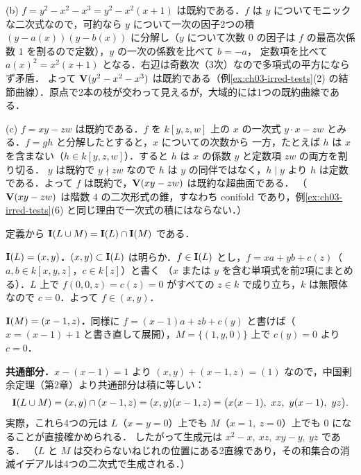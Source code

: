 (b) $f=y^2-x^2-x^3=y^2-x^2(x+1)$ は既約である．$f$ は $y$ についてモニックな二次式なので，可約なら $y$ について一次の因子2つの積
$(y-a(x))(y-b(x))$ に分解し（$y$ について次数 $0$ の因子は $f$ の最高次係数 $1$ を割るので定数），$y$ の一次の係数を比べて $b=-a$，
定数項を比べて $a(x)^2=x^2(x+1)$ となる．右辺は奇数次（3次）なので多項式の平方にならず矛盾．
よって $\mathbf{V}(y^2-x^2-x^3)$ は既約である（例\ref{ex:ch03-irred-tests}(2) の結節曲線）．原点で2本の枝が交わって見えるが，大域的には1つの既約曲線である．

(c) $f=xy-zw$ は既約である．$f$ を $k[y,z,w]$ 上の $x$ の一次式 $y\cdot x-zw$ とみる．$f=gh$ と分解したとすると，$x$ についての次数から
一方，たとえば $h$ は $x$ を含まない（$h\in k[y,z,w]$）．すると $h$ は $x$ の係数 $y$ と定数項 $zw$ の両方を割り切る．
$y$ は既約で $y\nmid zw$ なので $h$ は $y$ の同伴ではなく，$h\mid y$ より $h$ は定数である．よって $f$ は既約で，$\mathbf{V}(xy-zw)$ は既約な超曲面である．
（$\mathbf{V}(xy-zw)$ は階数 $4$ の二次形式の錐，すなわち conifold であり，例\ref{ex:ch03-irred-tests}(6) と同じ理由で一次式の積にはならない．）

定義から $\mathbf{I}(L\cup M)=\mathbf{I}(L)\cap\mathbf{I}(M)$ である．

\textbf{$\mathbf{I}(L)=(x,y)$．}$(x,y)\subset\mathbf{I}(L)$ は明らか．$f\in\mathbf{I}(L)$ とし，$f=xa+yb+c(z)$（$a,b\in k[x,y,z]$，$c\in k[z]$）と書く
（$x$ または $y$ を含む単項式を前2項にまとめる）．$L$ 上で $f(0,0,z)=c(z)=0$ がすべての $z\in k$ で成り立ち，$k$ は無限体なので $c=0$．よって $f\in(x,y)$．

\textbf{$\mathbf{I}(M)=(x-1,z)$．}同様に $f=(x-1)a+zb+c(y)$ と書けば（$x=(x-1)+1$ と書き直して展開），$M=\{(1,y,0)\}$ 上で $c(y)=0$ より $c=0$．

\textbf{共通部分．}$x-(x-1)=1$ より $(x,y)+(x-1,z)=(1)$ なので，中国剰余定理（第2章）より共通部分は積に等しい：
\[
  \Ideal(L\cup M)=(x,y)\cap(x-1,z)=(x,y)(x-1,z)=\bigl(x(x-1),\ xz,\ y(x-1),\ yz\bigr).
\]
実際，これら4つの元は $L$（$x=y=0$）上でも $M$（$x=1,\ z=0$）上でも $0$ になることが直接確かめられる．
したがって生成元は $x^2-x,\ xz,\ xy-y,\ yz$ である．
（$L$ と $M$ は交わらないねじれの位置にある2直線であり，その和集合の消滅イデアルは4つの二次式で生成される．）

